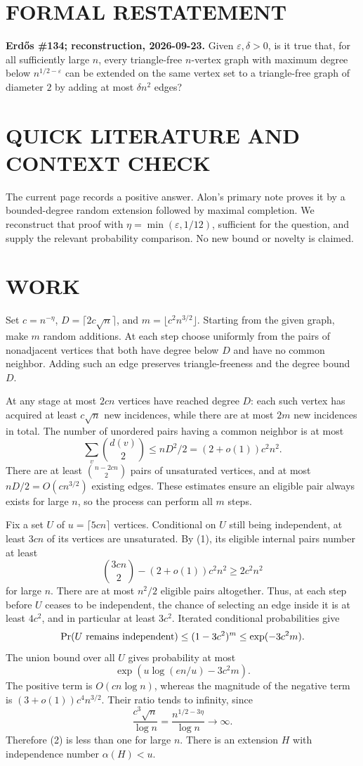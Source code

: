 \section{FORMAL RESTATEMENT}
\textbf{Erd\H{o}s \#134; reconstruction, 2026-09-23.}
Given $\varepsilon,\delta>0$, is it true that, for all sufficiently large
$n$, every triangle-free $n$-vertex graph with maximum degree below
$n^{1/2-\varepsilon}$ can be extended on the same vertex set to a
triangle-free graph of diameter $2$ by adding at most $\delta n^2$ edges?

\section{QUICK LITERATURE AND CONTEXT CHECK}
The current page records a positive answer. Alon's primary note proves
it by a bounded-degree random extension followed by maximal completion.
We reconstruct that proof with $\eta=\min(\varepsilon,1/12)$, sufficient
for the question, and supply the relevant probability comparison.
No new bound or novelty is claimed.

\section{WORK}
Set $c=n^{-\eta}$, $D=\lceil2c\sqrt n\rceil$, and
$m=\lfloor c^2 n^{3/2}\rfloor$. Starting from the given graph, make $m$
random additions. At each step choose uniformly from the pairs of
nonadjacent vertices that both have degree below $D$ and have no common
neighbor. Adding such an edge preserves triangle-freeness and the degree
bound $D$.

At any stage at most $2cn$ vertices have reached degree $D$: each such
vertex has acquired at least $c\sqrt n$ new incidences, while there
are at most $2m$ new incidences in total. The number of unordered pairs
having a common neighbor is at most
\[
 \sum_v\binom{d(v)}2\le nD^2/2=(2+o(1))c^2n^2.          \tag{1}
\]
There are at least $\binom{n-2cn}{2}$ pairs of unsaturated vertices,
and at most $nD/2=O(cn^{3/2})$ existing edges. These estimates ensure an
eligible pair always exists for large $n$, so the process can perform
all $m$ steps.

Fix a set $U$ of $u=\lceil5cn\rceil$ vertices. Conditional on $U$ still
being independent, at least $3cn$ of its vertices are unsaturated.
By (1), its eligible internal pairs number at least
\[
 \binom{3cn}{2}-(2+o(1))c^2n^2\ge2c^2n^2
\]
for large $n$. There are at most $n^2/2$ eligible pairs altogether.
Thus, at each step before $U$ ceases to be independent, the chance
of selecting an edge inside it is at least $4c^2$, and in particular
at least $3c^2$. Iterated conditional probabilities give
\[
 \Pr(U\hbox{ remains independent})\le(1-3c^2)^m
 \le\exp(-3c^2m).
\]
The union bound over all $U$ gives probability at most
\[
 \exp\left(u\log(en/u)-3c^2m\right).                     \tag{2}
\]
The positive term is $O(cn\log n)$, whereas the magnitude of the
negative term is $(3+o(1))c^4n^{3/2}$. Their ratio tends to infinity,
since
\[
 \frac{c^3\sqrt n}{\log n}
 =\frac{n^{1/2-3\eta}}{\log n}\longrightarrow\infty.
\]
Therefore (2) is less than one for large $n$. There is an extension
$H$ with independence number $\alpha(H)<u$.


